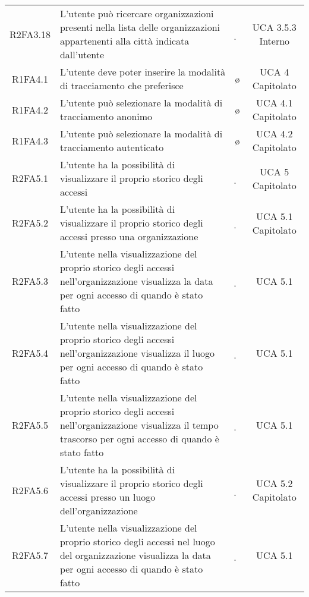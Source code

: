 {\begin{longtable}{ c C{8cm} c c}
R2FA3.18 & L’utente può ricercare organizzazioni presenti nella lista delle organizzazioni appartenenti alla città indicata dall’utente & \d & UCA 3.5.3 Interno \\

R1FA4.1 & L’utente deve poter inserire la modalità di tracciamento che preferisce & \o & UCA 4 Capitolato \\

R1FA4.2 & L’utente può selezionare la modalità di tracciamento anonimo & \o & UCA 4.1 Capitolato \\

R1FA4.3 & L’utente può selezionare la modalità di tracciamento autenticato & \o & UCA 4.2 Capitolato \\

R2FA5.1 & L’utente ha la possibilità di visualizzare il proprio storico degli accessi & \d & UCA 5 Capitolato \\

R2FA5.2 & L’utente ha la possibilità di visualizzare il proprio storico degli accessi presso una organizzazione  & \d & UCA 5.1 Capitolato \\

R2FA5.3 & L'utente nella visualizzazione del proprio storico degli accessi nell'organizzazione visualizza la data per ogni accesso di quando è stato fatto & \d &  UCA 5.1 \\

R2FA5.4 & L'utente nella visualizzazione del proprio storico degli accessi nell'organizzazione visualizza il luogo per ogni accesso di quando è stato fatto & \d &  UCA 5.1 \\

R2FA5.5 & L'utente nella visualizzazione del proprio storico degli accessi nell'organizzazione visualizza il tempo trascorso per ogni accesso di quando è stato fatto & \d &  UCA 5.1 \\

R2FA5.6 & L’utente ha la possibilità di visualizzare il proprio storico degli accessi presso un luogo dell’organizzazione & \d & UCA 5.2 Capitolato\\

R2FA5.7 & L'utente nella visualizzazione del proprio storico degli accessi nel luogo del organizzazione visualizza la data per ogni accesso di quando è stato fatto & \d &  UCA 5.1 \\


\end{longtable}}
